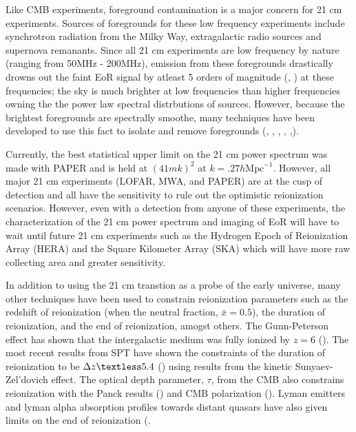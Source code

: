 \documentclass[twocolumn,numberedappendix]{emulateapj} \shorttitle{PSA64}
\begin{document}
Like CMB experiments, foreground contamination is a major concern for 21 cm
experiments. Sources of foregrounds for these low frequency experiments include
synchrotron radiation from the Milky Way, extragalactic radio sources and
supernova remanants. Since all 21 cm experiments are low frequency by nature
(ranging from 50MHz - 200MHz), emission from these foregrounds drastically
drowns out the faint EoR signal by atleast 5 orders of magnitude
(\cite{furlanetto_et_al2006}, \cite{santos_et_al2005}) at these frequencies; the
sky is much brighter at low frequencies than higher frequencies owning the the
power law spectral distrbutions of sources. However, because the brightest
foregrounds are spectrally smoothe, many techniques have been developed to use
this fact to isolate and remove foregrounds (\cite{morales_et_al2006a},
\cite{bowman_et_al2009}, \cite{liu_et_al2009}, \cite{liu_tegmark2011},
\cite{parsons_et_al2012b},\cite{dillon_et_al2013a}).

Currently, the best statistical upper limit on the 21 cm power spectrum was made
with PAPER and is held at $(41 mk)^{2}$ at $k=.27 h \text{Mpc}^{-1}$. However,
all major 21 cm experiments (LOFAR, MWA, and PAPER) are at the cusp of detection
and all have the sensitivity to rule out the optimistic reionization scenarios.
However, even with a detection from anyone of these experiments, the
characterization of the 21 cm power spectrum and imaging of EoR will have to
wait until future 21 cm experiments such as the Hydrogen Epoch of Reionization
Array (HERA) and the Square Kilometer Array (SKA) which will have more raw
collecting area and greater sensitivity. 

In addition to using the 21 cm transtion as a probe of the early universe, many
other techniques have been used to constrain reionization parameters such as
the redshift of reionization (when the neutral fraction, $\bar{x} = 0.5$), the
duration of reionization, and the end of reionization, amogst others. The
Gunn-Peterson effect has shown that the intergalactic medium was fully ionized
by $z=6$ (\cite{fan_et_al2006}). The most recent results from SPT have shown
the constraints of the duration of reionization to be  $\Delta{z} \textless 5.4$
(\cite{george_et_al2014}) using results from the kinetic Sunyaev-Zel'dovich
effect. The optical depth parameter, $\tau$, from the CMB also constrains
reionization with the Panck results (\cite{planck_et_al2013}) and CMB
polarization (\cite{page_et_al2007}). Lyman emitters and lyman alpha absorption
profiles towards distant quasars have also given limits on the end of
reionization
(\cite{schenker_et_al2013,treu_et_al2013,faisst_et_al2014,bolton_et_al2011}.
\end{document}
